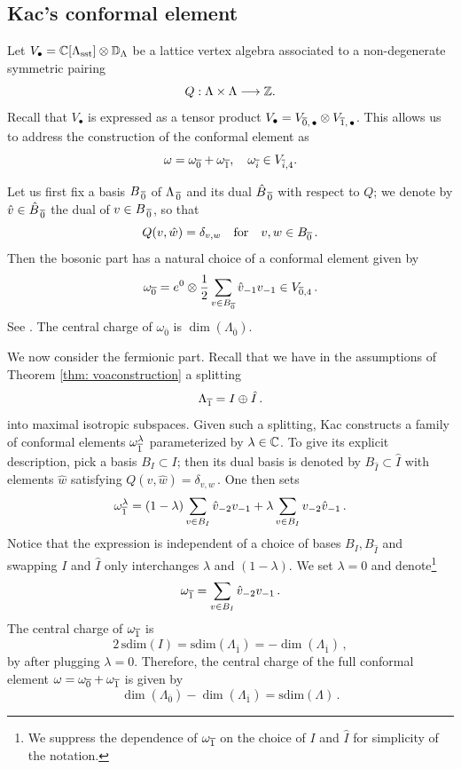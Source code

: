 \documentclass[a4paper, 12pt]{amsart}
\begin{document}
\subsection{Kac's conformal element}
\label{sec: Kacconformal}

Let $V_\bullet = {\mathbb{C}}[\Lambda_{\text{sst}}]\otimes {\mathbb{D}}_\Lambda$ be a lattice vertex algebra associated to a non-degenerate symmetric pairing 
$$
Q:\Lambda\times \Lambda\longrightarrow {\mathbb{Z}}.
$$
Recall that $V_\bullet$ is expressed as a tensor product  $V_\bullet = V_{\overline{0},\,\bullet}\otimes V_{\overline{1},\,\bullet}$. This allows us to address the construction of the conformal element as
$$\omega=\omega_{\overline{0}}+\omega_{\overline{1}},\quad \omega_{\overline{i}}\in V_{\overline{i},4}.
$$

Let us first fix a basis $B_{\,\overline{0}}$ of $\Lambda_{\,\overline{0}}$ and its dual $\hat{B}_{\,\overline{0}}$ with respect to $Q$; we denote by $\hat{v}\in \hat{B}_{\,\overline{0}}$ the dual of $v\in B_{\,\overline{0}}$, so that
\[Q(v, \hat w)=\delta_{v,w}\quad\textup{for}\quad v, w\in B_{\overline 0}\,.\]Then the bosonic part has a natural choice of a conformal element given by
$$
\omega_{\overline{0}} = e^0\otimes \frac{1}{2}\sum_{v\in B_{\overline{0}}}\hat{v}_{-1} v_{-1} \in V_{\overline{0},4}\,.
$$
See \cite[Proposition 5.5]{Ka98}. The central charge of $\omega_{\overline 0}$ is $\dim(\Lambda_{\overline 0})$.

We now consider the fermionic part. Recall that we have in the assumptions of Theorem \ref{thm: voaconstruction} a splitting
\begin{equation}
\label{Eq: splittingisotropic}
\Lambda_{\overline{1}} = I\oplus \hat{I}\,.
\end{equation}
into maximal isotropic subspaces. Given such a splitting, Kac \cite[3.6.14]{Ka98} constructs a family of conformal elements $\omega^\lambda_{\overline{1}}$ parameterized by $\lambda\in {\mathbb{C}}$. To give its explicit description, pick a basis $B_I\subset I$; then its dual basis is denoted by $B_{\hat{I}}\subset \hat{I}$ with elements $\hat{w}$ satisfying 
$Q(v,\hat{w}) = \delta_{v,w}\,.$ One then sets
$$
\omega^\lambda_{\overline{1}} = (1-\lambda)\sum_{v\in B_I}\hat{v}_{-2}v_{-1} + \lambda \sum_{v\in B_I}v_{-2}\hat{v}_{-1}\,.
$$
Notice that the expression is independent of a choice of bases $B_I,B_{\hat{I}}$ and swapping $I$ and $\hat{I}$ only interchanges $\lambda$ and $(1-\lambda)$. We set $\lambda=0$ and denote\footnote{We suppress the dependence of $\omega_{\overline{1}}$ on the choice of $I$ and $\hat{I}$ for simplicity of the notation.}
$$
\omega_{\overline{1}} = \sum_{v\in B_I}\hat{v}_{-2}v_{-1}\,.
$$
The central charge of $\omega_{\overline{1}}$ is 
\[2\,\mathrm{sdim}(I)=\mathrm{sdim}(\Lambda_{\overline 1})=-\dim(\Lambda_{\overline 1})\,,\]
by \cite[3.6.16]{Ka98} after plugging $\lambda=0$. Therefore,  the central charge of the full conformal element $\omega=\omega_{\overline{0}}+\omega_{\overline{1}}$ is given by
$$\dim(\Lambda_{\overline{0}})-\dim(\Lambda_{\overline{1}})=\mathrm{sdim}(\Lambda)\,.
$$
\end{document}
